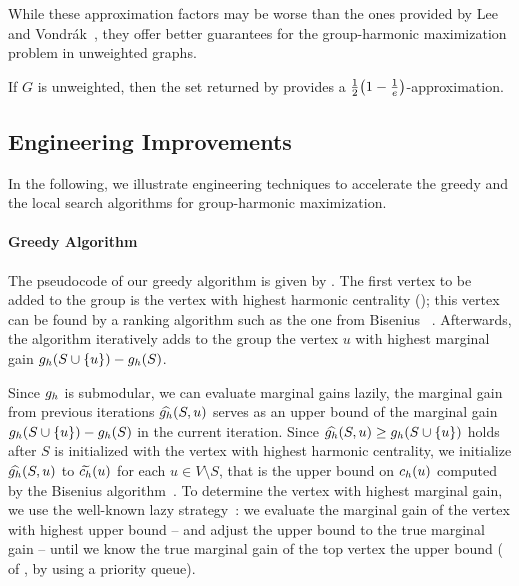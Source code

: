 While these approximation factors may be worse than the ones provided by
Lee \etal~\cite{DBLP:journals/siamdm/LeeMNS10} and
Vondr\'ak~\cite{DBLP:conf/focs/Vondrak09}, they offer better guarantees
for the group-harmonic maximization problem in unweighted graphs.

\begin{lemma}
If $G$ is unweighted, then the set returned by 
provides a $\frac 12\roundb{1 - \frac 1e}$-approximation.
\end{lemma}

\subsection{Engineering Improvements}
\label{sec:gh-gc:algo-eng}
%
In the following, we illustrate engineering techniques to accelerate the greedy
and the local search algorithms for group-harmonic maximization.

\paragraph{Greedy Algorithm}
%


The pseudocode of our greedy algorithm is given by .
The first vertex to be added to the group is the vertex with highest
harmonic centrality (); this vertex can be
found by a ranking algorithm such as the one from Bisenius
\etal~\cite{DBLP:conf/alenex/BiseniusBAM18}. Afterwards, the algorithm
iteratively adds to the group the vertex $u$ with highest marginal gain
$\gharm(S \cup \set{u}) - \gharm(S)$.

Since $g_h$ is submodular, we can evaluate marginal gains lazily,
\ie the marginal gain from previous iterations $\widehat{g_h}(S, u)$ serves
as an upper bound of the marginal gain $\gharm(S \cup \set{u}) - \gharm(S)$
in the current iteration. Since $\gharmupp(S, u) \ge \gharm(S\cup\set{u})$
holds after $S$ is initialized with the vertex with highest harmonic
centrality, we initialize $\widehat{g_h}(S, u)$ to $\widetilde{c_h}(u)$ for each
$u \in V \setminus S$, that is the upper bound on $c_h(u)$ computed
by the Bisenius \etal algorithm~\cite{DBLP:conf/alenex/BiseniusBAM18}.
To determine the vertex with highest marginal gain, we use the well-known
lazy strategy~\cite{minoux1978accelerated}: we evaluate the marginal
gain of the vertex with highest upper bound -- and adjust the upper bound
to the true marginal gain -- until we know the true marginal gain of the
top vertex \wrt the upper bound
(
of , by using a priority queue).

